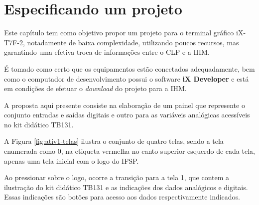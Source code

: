 \chapter{Especificando um projeto}
\label{chap:especificando_projeto}


Este capítulo tem como objetivo propor um projeto para o terminal gráfico iX-T7F-2, notadamente de baixa complexidade, utilizando poucos recursos, mas garantindo uma efetiva troca de informações entre o CLP e a IHM. 

É tomado como certo que os equipamentos estão conectados adequadamente, bem como o computador de desenvolvimento possui o software \textbf{iX Developer} e está em condições de efetuar o \textit{download} do projeto para a \acrshort{IHM}.

A proposta aqui presente consiste na elaboração de um painel que represente o conjunto entradas e saídas digitais e outro para as variáveis analógicas acessíveis no kit didático TB131.

A Figura \ref{fig:ativ1-telas} ilustra o conjunto de quatro telas, sendo a tela enumerada como 0, na etiqueta vermelha no canto superior esquerdo de cada tela, apenas uma tela inicial com o logo do IFSP.

\begin{figure}[ht!]
	\centering
\end{figure}



Ao pressionar sobre o logo, ocorre a transição para a tela 1, que contem a ilustração do kit didático TB131 e as indicações dos dados analógicos e digitais. Essas indicações são botões para acesso aos dados respectivamente indicados.

